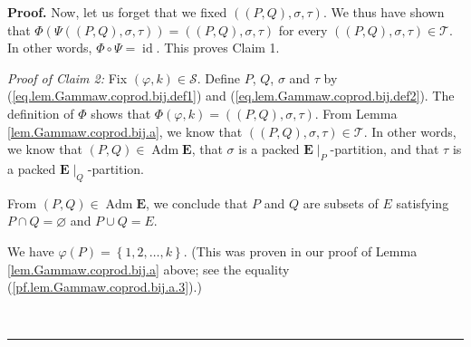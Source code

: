\documentclass[numbers=enddot,12pt,final,onecolumn,notitlepage,abstracton]{scrartcl}
\theoremstyle{definition}
\newenvironment{proof}[1][Proof]{\noindent\textbf{#1.} }{\ \rule{0.5em}{0.5em}}
\newenvironment{verlong}{}{}
\newcommand{\id}{{\operatorname{id}}}
\newcommand{\Adm}{\operatorname{Adm}}
\newcommand{\EE}{{\mathbf{E}}}
\begin{document}
\begin{verlong}
\begin{proof}
Now, let us forget that we fixed $\left(  \left(  P,Q\right)  ,\sigma
,\tau\right)  $. We thus have shown that \newline
$\Phi\left(  \Psi\left(  \left(
P,Q\right)  ,\sigma,\tau\right)  \right)  =\left(  \left(  P,Q\right)
,\sigma,\tau\right)  $ for every $\left(  \left(  P,Q\right)  ,\sigma
,\tau\right)  \in\mathcal{T}$. In other words, $\Phi\circ\Psi
=\id$. This proves Claim 1.

\textit{Proof of Claim 2:} Fix $\left(  \varphi,k\right)  \in\mathcal{S}$.
Define $P$, $Q$, $\sigma$ and $\tau$ by (\ref{eq.lem.Gammaw.coprod.bij.def1})
and (\ref{eq.lem.Gammaw.coprod.bij.def2}). The definition of $\Phi$ shows that
$\Phi\left(  \varphi,k\right)  =\left( \left(P,Q\right),\sigma,\tau\right)  $. From Lemma
\ref{lem.Gammaw.coprod.bij.a}, we know that $\left(  \left(  P,Q\right)
,\sigma,\tau\right)  \in\mathcal{T}$. In other words, we know that $\left(
P,Q\right)  \in \Adm \EE $, that $\sigma$ is a packed
$ \EE \mid_{P}$-partition, and that $\tau$ is a packed
$\EE\mid_{Q}$-partition.

From $\left(  P,Q\right)  \in \Adm \EE$, we conclude that
$P$ and $Q$ are subsets of $E$ satisfying $P\cap Q=\varnothing$ and $P\cup
Q=E$.

We have $\varphi\left(  P\right)  =\left\{  1,2,\ldots,k\right\}  $. (This was
proven in our proof of Lemma \ref{lem.Gammaw.coprod.bij.a} above; see the
equality (\ref{pf.lem.Gammaw.coprod.bij.a.3}).)


\end{proof}
\end{verlong}
\end{document}
